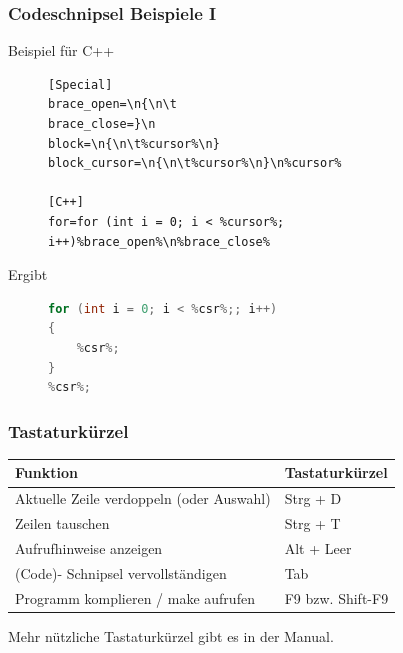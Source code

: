 \documentclass[compress]{beamer}
\begin{document}
\begin{frame}[containsverbatim]
	\frametitle{Codeschnipsel Beispiele I}
	\begin{block}{Beispiel für C++}
		\begin{figure}[!h]
			\begin{lstlisting}[frame=none]
[Special]
brace_open=\n{\n\t
brace_close=}\n
block=\n{\n\t%cursor%\n}
block_cursor=\n{\n\t%cursor%\n}\n%cursor%

[C++]
for=for (int i = 0; i < %cursor%; i++)%brace_open%\n%brace_close%
			\end{lstlisting}
		\end{figure}
	\end{block}

	\begin{block}{Ergibt}
		\begin{figure}[!h]
			\begin{lstlisting}[frame=none, language=C++]
for (int i = 0; i < %csr%;; i++)
{
	%csr%;
}
%csr%;
			\end{lstlisting}
		\end{figure}
	\end{block}
\end{frame}

\begin{frame}
	\frametitle{Tastaturkürzel}
	\begin{block}{}
		\centering
		\begin{table}[h!]
			\begin{tabular}{ll}
				\textbf{Funktion} & \textbf{Tastaturkürzel} \\ \hline
				Aktuelle Zeile verdoppeln (oder Auswahl) & Strg + D \\
				Zeilen tauschen & Strg + T \\
				Aufrufhinweise anzeigen & Alt + Leer \\
				(Code)- Schnipsel vervollständigen & Tab \\
				Programm komplieren / make aufrufen & F9 bzw. Shift-F9
			\end{tabular}
		\end{table}
	\end{block}
\pause
Mehr nützliche Tastaturkürzel gibt es in der Manual.
\end{frame}
\end{document}
